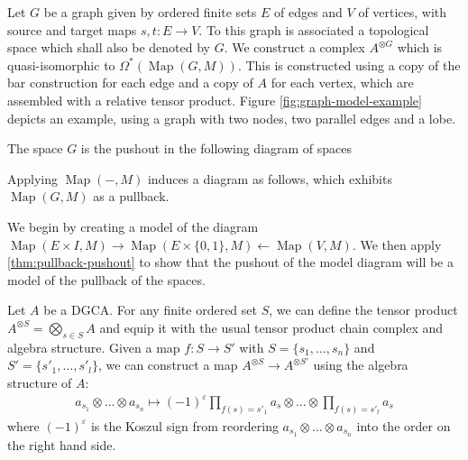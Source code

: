 \documentclass{scrartcl}
\theoremstyle{plain}
\theoremstyle{definition}
\renewcommand{\epsilon}{\varepsilon}
\newcommand{\from}{\leftarrow}
\DeclareMathOperator{\Map}{Map}
\renewcommand{\coprod}{\mathbin{\amalg}}
\newcommand{\Prod}{\prod}
\newcommand{\blank}{-}
\begin{document}
Let $G$ be a graph given by ordered finite sets $E$ of edges and $V$ of vertices, with source and target maps $s, t\colon E\to V$. To this graph is associated a topological space which shall also be denoted by $G$. We construct a complex $A^{\otimes G}$ which is quasi-isomorphic to $\Omega^*(\Map(G, M))$. This is constructed using a copy of the bar construction for each edge and a copy of $A$ for each vertex, which are assembled with a relative tensor product. Figure \ref{fig:graph-model-example} depicts an example, using a graph with two nodes, two parallel edges and a lobe. 

The space $G$ is the pushout in the following diagram of spaces
\begin{center}
\end{center}
Applying $\Map(\blank, M)$ induces a diagram as follows, which exhibits $\Map(G, M)$ as a pullback. 
\begin{center}\label{diag:mapping-space-pullback}
\end{center}
We begin by creating a model of the diagram $\Map(E\times I, M) \to \Map(E\times \{0, 1\}, M)  \from \Map(V, M)$. We then apply \cref{thm:pullback-pushout} to show that the pushout of the model diagram will be a model of the pullback of the spaces. 



Let $A$ be a DGCA. For any finite ordered set $S$, we can define the tensor product $A^{\otimes S} = \bigotimes_{s\in S} A$ and equip it with the usual tensor product chain complex and algebra structure. Given a map $f\colon S\to S'$ with $S = \{s_1,\dots, s_n\}$ and $S' = \{s'_1,\dots, s'_l\}$, we can construct a map $A^{\otimes S}\to A^{\otimes S'}$ using the algebra structure of $A$:
\begin{align*}
    a_{s_1}\otimes\dots\otimes a_{s_n}\mapsto (-1)^\epsilon \Prod_{f(s) =s'_1} a_s \otimes\dots \otimes \Prod_{f(s) =s'_l} a_s
\end{align*}
where $(-1)^\epsilon$ is the Koszul sign from reordering $a_{s_1}\otimes\dots\otimes a_{s_n}$ into the order on the right hand side. 
\end{document}
